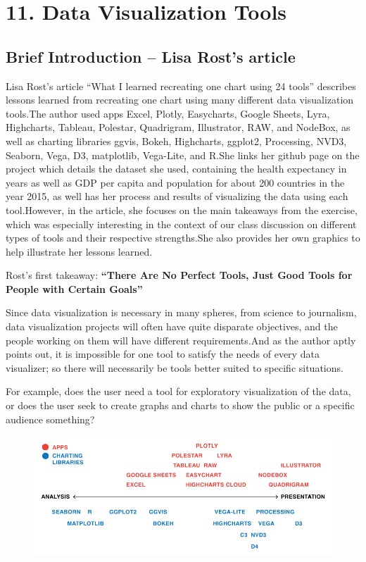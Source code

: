 \documentclass[]{book}
\theoremstyle{definition}
\theoremstyle{definition}
\theoremstyle{definition}
\theoremstyle{remark}
\begin{document}
\section{11. Data Visualization Tools}\label{data-visualization-tools}

\subsection{Brief Introduction -- Lisa Rost's
article}\label{brief-introduction-lisa-rosts-article}

Lisa Rost's article ``What I learned recreating one chart using 24
tools'' describes lessons learned from recreating one chart using many
different data visualization tools.The author used apps Excel, Plotly,
Easycharts, Google Sheets, Lyra, Highcharts, Tableau, Polestar,
Quadrigram, Illustrator, RAW, and NodeBox, as well as charting libraries
ggvis, Bokeh, Highcharts, ggplot2, Processing, NVD3, Seaborn, Vega, D3,
matplotlib, Vega-Lite, and R.She links her github page on the project
which details the dataset she used, containing the health expectancy in
years as well as GDP per capita and population for about 200 countries
in the year 2015, as well has her process and results of visualizing the
data using each tool.However, in the article, she focuses on the main
takeaways from the exercise, which was especially interesting in the
context of our class discussion on different types of tools and their
respective strengths.She also provides her own graphics to help
illustrate her lessons learned.

Rost's first takeaway: \textbf{``There Are No Perfect Tools, Just Good
Tools for People with Certain Goals''}

Since data visualization is necessary in many spheres, from science to
journalism, data visualization projects will often have quite disparate
objectives, and the people working on them will have different
requirements.And as the author aptly points out, it is impossible for
one tool to satisfy the needs of every data visualizer; so there will
necessarily be tools better suited to specific situations.

For example, does the user need a tool for exploratory visualization of
the data, or does the user seek to create graphs and charts to show the
public or a specific audience something?

\begin{figure}
\centering
\includegraphics{images/analysis_spectrum.png}
\caption{}
\end{figure}
\end{document}
